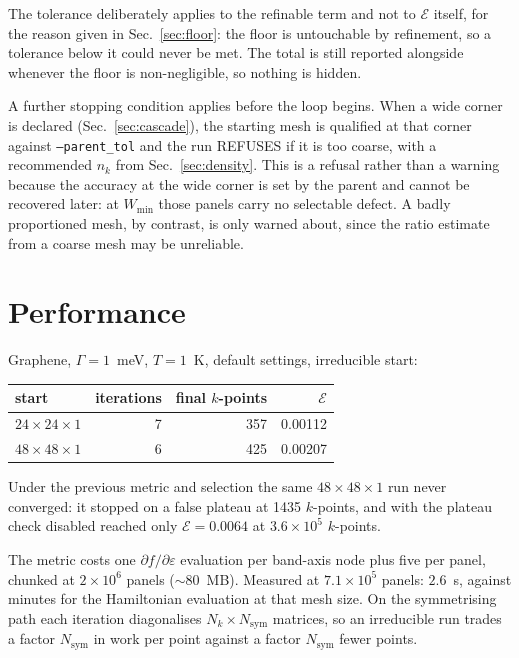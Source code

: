 \documentclass[11pt,a4paper]{article}
\newcommand{\dfda}{\partial f/\partial\varepsilon}
\newcommand{\code}[1]{\texttt{#1}}
\begin{document}
The tolerance deliberately applies to the refinable term and not to
$\mathcal{E}$ itself, for the reason given in Sec.~\ref{sec:floor}: the floor
is untouchable by refinement, so a tolerance below it could never be met. The
total is still reported alongside whenever the floor is non-negligible, so
nothing is hidden.

A further stopping condition applies before the loop begins. When a wide corner
is declared (Sec.~\ref{sec:cascade}), the starting mesh is qualified at that
corner against \code{--parent\_tol} and the run REFUSES if it is too coarse,
with a recommended $n_k$ from Sec.~\ref{sec:density}. This is a refusal rather
than a warning because the accuracy at the wide corner is set by the parent and
cannot be recovered later: at $W_\text{min}$ those panels carry no selectable
defect. A badly proportioned mesh, by contrast, is only warned about, since the
ratio estimate from a coarse mesh may be unreliable.

\section{Performance}

Graphene, $\Gamma=1$~meV, $T=1$~K, default settings, irreducible start:

\begin{center}
\begin{tabular}{lrrr}
\toprule
start & iterations & final $k$-points & $\mathcal{E}$ \\
\midrule
$24\times24\times1$ & 7 &  357 & 0.00112 \\
$48\times48\times1$ & 6 &  425 & 0.00207 \\
\bottomrule
\end{tabular}
\end{center}

\noindent
Under the previous metric and selection the same $48\times48\times1$ run
never converged: it stopped on a false plateau at 1435 $k$-points, and with
the plateau check disabled reached only $\mathcal{E}=0.0064$ at
$3.6\times10^{5}$ $k$-points.

The metric costs one $\dfda$ evaluation per band-axis node plus five per
panel, chunked at $2\times10^{6}$ panels ($\sim80$~MB). Measured at
$7.1\times10^{5}$ panels: $2.6$~s, against minutes for the Hamiltonian
evaluation at that mesh size. On the symmetrising path each iteration
diagonalises $N_k \times N_\text{sym}$ matrices, so an irreducible run trades
a factor $N_\text{sym}$ in work per point against a factor $N_\text{sym}$
fewer points.
\end{document}
